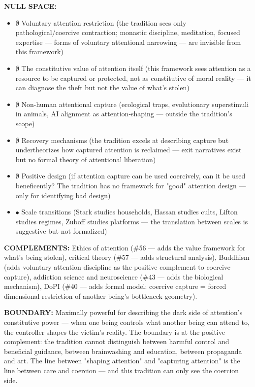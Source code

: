 \textbf{NULL SPACE:}

\begin{itemize}[nosep,leftmargin=*]
  \item $\emptyset$ Voluntary attention restriction (the tradition sees only pathological/\allowbreak coercive contraction; monastic discipline, meditation, focused expertise — forms of voluntary attentional narrowing — are invisible from this framework)
  \item $\emptyset$ The constitutive value of attention itself (this framework sees attention as a resource to be captured or protected, not as constitutive of moral reality — it can diagnose the theft but not the value of what's stolen)
  \item $\emptyset$ Non-human attentional capture (ecological traps, evolutionary superstimuli in animals, AI alignment as attention-shaping — outside the tradition's scope)
  \item $\emptyset$ Recovery mechanisms (the tradition excels at describing capture but undertheorizes how captured attention is reclaimed — exit narratives exist but no formal theory of attentional liberation)
  \item $\emptyset$ Positive design (if attention capture can be used coercively, can it be used beneficently? The tradition has no framework for "good" attention design — only for identifying bad design)
  \item $\bullet$ Scale transitions (Stark studies households, Hassan studies cults, Lifton studies regimes, Zuboff studies platforms — the translation between scales is suggestive but not formalized)
\end{itemize}


\textbf{COMPLEMENTS:} Ethics of attention (\#56 — adds the value framework for what's being stolen), critical theory (\#57 — adds structural analysis), Buddhism (adds voluntary attention discipline as the positive complement to coercive capture), addiction science and neuroscience (\#43 — adds the biological mechanism), DoPI (\#40 — adds formal model: coercive capture = forced dimensional restriction of another being's bottleneck geometry).


\textbf{BOUNDARY:} Maximally powerful for describing the dark side of attention's constitutive power — when one being controls what another being can attend to, the controller shapes the victim's reality. The boundary is at the positive complement: the tradition cannot distinguish between harmful control and beneficial guidance, between brainwashing and education, between propaganda and art. The line between "shaping attention" and "capturing attention" is the line between care and coercion — and this tradition can only see the coercion side.


